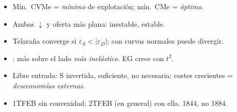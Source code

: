 \documentclass{article}
\begin{document}
\begin{columnas}
\begin{enumerate}
\end{enumerate}
\begin{trampa}
\begin{itemize}
\item Mín.\ CVMe = \emph{mínimo} de explotación; mín.\ CMe = \emph{óptimo}.
\item Ambas $\downarrow$ y oferta más plana:  inestable,  estable.
\item Telaraña converge si $\varepsilon_S<\lvert\varepsilon_D\rvert$; con curvas normales puede divergir.
\item {}: más sobre el lado \emph{más inelástico}. EG crece con $t^2$.
\item Libre entrada: S invertida, suficiente, no necesaria; costes crecientes = \emph{deseconomías externas}.
\item 1TFEB sin convexidad; 2TFEB (en general) con ella.  1844, no 1884.
\end{itemize}
\end{trampa}

\end{columnas}
\end{document}
